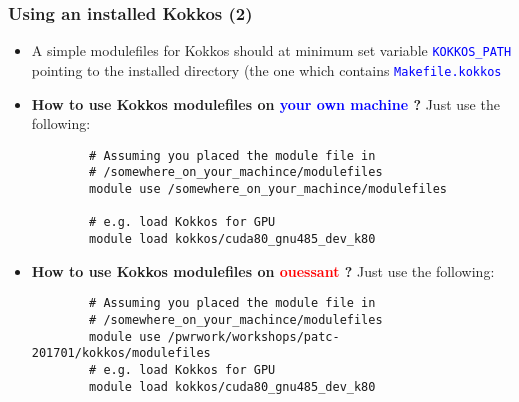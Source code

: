 \begin{frame}[fragile=singleslide]
  \frametitle{Using an installed Kokkos (2)}

  \begin{itemize}
  \item A simple modulefiles for Kokkos should at minimum set variable \textcolor{blue}{\texttt{KOKKOS\_PATH}} pointing to the installed directory (the one which contains \textcolor{blue}{\texttt{Makefile.kokkos}}
  \item {\bf How to use Kokkos modulefiles on \textcolor{blue}{your own machine} ?} Just use the following: 
    {\small
      \begin{verbatim}
        # Assuming you placed the module file in
        # /somewhere_on_your_machince/modulefiles
        module use /somewhere_on_your_machince/modulefiles
        
        # e.g. load Kokkos for GPU
        module load kokkos/cuda80_gnu485_dev_k80
      \end{verbatim}
    }
  \item {\bf How to use Kokkos modulefiles on \textcolor{red}{ouessant} ?} Just use the following:
    {\small
      \begin{verbatim}
        # Assuming you placed the module file in
        # /somewhere_on_your_machince/modulefiles
        module use /pwrwork/workshops/patc-201701/kokkos/modulefiles
        # e.g. load Kokkos for GPU
        module load kokkos/cuda80_gnu485_dev_k80
      \end{verbatim}
    }
  \end{itemize}

\end{frame}
